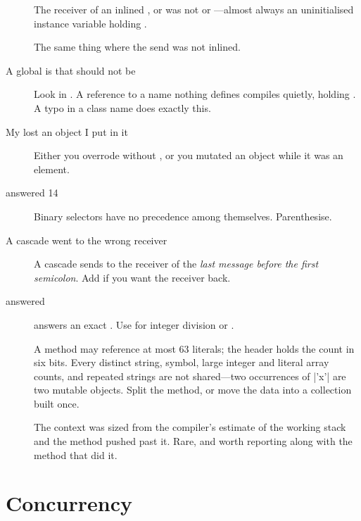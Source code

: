 \begin{description}
\item[] The receiver of an inlined ,
   or  was not  or ---almost always
  an uninitialised instance variable holding .
\item[] The same thing where the send was
  not inlined.
\item[A global is  that should not be] Look in . A
  reference to a name nothing defines compiles quietly, holding . A
  typo in a class name does exactly this.
\item[My  lost an object I put in it] Either you overrode \ct{=}
  without , or you mutated an object while it was an element.
\item[ answered 14] Binary selectors have no precedence among
  themselves. Parenthesise.
\item[A cascade went to the wrong receiver] A cascade sends to the receiver of
  the \emph{last message before the first semicolon}. Add  if you
  want the receiver back.
\item[ answered ] \ct{/} answers an exact
  . Use \ct{//} for integer division or .
\item[] A method may reference at most
  63 literals; the header holds the count in six bits. Every distinct string,
  symbol, large integer and literal array counts, and repeated strings are not
  shared---two occurrences of \ct|'x'| are two mutable objects. Split the
  method, or move the data into a collection built once.
\item[] The context was sized from the
  compiler's estimate of the working stack and the method pushed past it.
  Rare, and worth reporting along with the method that did it.
\end{description}

\section{Concurrency}

